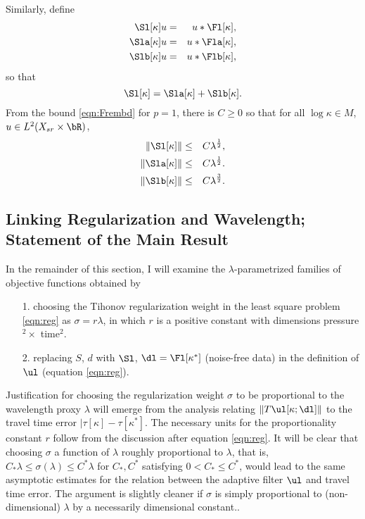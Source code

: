 Similarly, define
\begin{eqnarray}
  \label{eqn:sdeflam}
  \Sl[\kappa]u &=& u *\Fl[\kappa],  \nonumber \\
  \Sla[\kappa]u &=& u *\Fla[\kappa], \nonumber\\
  \Slb[\kappa]u &=& u *\Flb[\kappa], 
\end{eqnarray}
so that
\[
  \Sl[\kappa] = \Sla[\kappa] + \Slb[\kappa].
\]
From the bound \ref{eqn:Frembd} for $p=1$, there is $C \ge 0$ so that
for all $\log \kappa \in M$, $u \in L^2(X_{sr} \times \bR)$,
\begin{eqnarray}
  \label{eqn:Srembd}
  \|\Sl[\kappa]\| &\le&  C\lambda^{\frac{1}{2}},\nonumber \\
  \|\Sla[\kappa]\|& \le& C\lambda^{\frac{1}{2}}. \nonumber \\
  \|\Slb[\kappa]\| & \le& C\lambda^{\frac{3}{2}}.
\end{eqnarray}

\subsection{Linking Regularization and Wavelength; Statement of the
  Main Result}
In the remainder of this section, I will examine the $\lambda$-parametrized families of
objective functions obtained by
\begin{itemize}
\item[1. ] choosing the Tihonov regularization weight in the least
  square problem \ref{eqn:reg} as $\sigma = r\lambda$, in which $r$ is
  a positive constant with dimensions pressure$^2 \times $ time$^2$.
\item[2. ]replacing $S$, $d$ with $\Sl$, $\dl =\Fl[\kappa^*]$
  (noise-free data) in the definition of $\ul$ (equation \ref{eqn:reg}).
\end{itemize}

Justification for choosing the regularization weight $\sigma$ to be
proportional to
the wavelength proxy $\lambda$ will emerge from the analysis relating
$\|T\ul[\kappa;\dl]\|$ to the travel
time error $|\tau[\kappa]-\tau[\kappa^*]$. The necessary units for the
proportionality constant $r$ follow from the discussion after equation
\ref{eqn:reg}. It will be clear that choosing $\sigma$ a function of
$\lambda$ roughly proportional to $\lambda$, that is, $C_*\lambda \le
\sigma(\lambda) \le C^*\lambda$ for $C_*,C^*$ satisfying $0 < C_* \le
C^*$, would lead to the same asymptotic estimates for the relation
between the adaptive filter $\ul$ and travel time
error. The argument is slightly cleaner if $\sigma$ is simply
proportional to (non-dimensional) $\lambda$ by a necessarily
dimensional constant..



